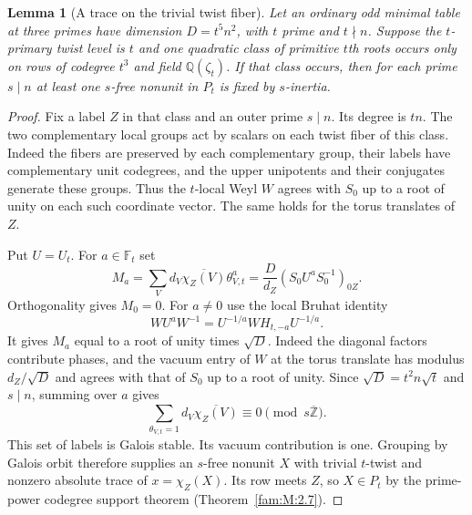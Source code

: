 \documentclass[11pt,a4paper]{article}
\numberwithin{equation}{section}
\newtheorem{lemma}[theorem]{Lemma}
\theoremstyle{remark}
\newcommand{\QQ}{\mathbb Q}
\begin{document}
\begin{lemma}[A trace on the trivial twist fiber]\label{fam:Q:5.2}\label{fam:Q:n:q13:filtered}
Let an ordinary odd minimal table at three primes have dimension
$D=t^5n^2$, with $t$ prime and $t\nmid n$. Suppose the $t$-primary twist level
is $t$ and one quadratic class of primitive $t$th roots occurs
only on rows of codegree $t^3$ and field $\QQ(\zeta_t)$.
If that class occurs, then for each prime $s\mid n$ at least one
$s$-free nonunit in $P_t$ is fixed by $s$-inertia.
\end{lemma}
\begin{proof}
Fix a label $Z$ in that class and an outer prime $s\mid n$.
Its degree is $tn$. The two complementary local groups act by
scalars on each twist fiber of this class. Indeed the fibers are
preserved by each complementary group, their labels have
complementary unit codegrees, and the upper unipotents and their
conjugates generate these groups. Thus the $t$-local Weyl $W$
agrees with $S_0$ up to a root of unity on each such coordinate vector.
The same holds for the torus translates of $Z$.

Put $U=U_t$. For $a\in\mathbb F_t$ set
\[
 M_a=\sum_V d_V\overline{\chi_Z(V)}\theta_{V,t}^{a}
     =\frac{D}{d_Z}(S_0U^a S_0^{-1})_{0Z}.
\]
Orthogonality gives $M_0=0$. For $a\ne0$ use the local Bruhat identity
\[
               WU^aW^{-1}=U^{-1/a}WH_{t,-a}U^{-1/a}.
\]
It gives $M_a$ equal to a root of unity times $\sqrt D$. Indeed
the diagonal factors contribute phases, and the vacuum entry of
$W$ at the torus translate has modulus $d_Z/\sqrt D$ and
agrees with that of $S_0$ up to a root of unity. Since
$\sqrt D=t^2 n\sqrt t$ and $s\mid n$, summing over $a$ gives
\[
           \sum_{\theta_{V,t}=1} d_V\overline{\chi_Z(V)}
                      \equiv0\pmod {s\overline{\mathbb Z}} .
\]
This set of labels is Galois stable. Its vacuum contribution is
one. Grouping by Galois orbit therefore supplies an $s$-free
nonunit $X$ with trivial $t$-twist and nonzero absolute trace of
$x=\chi_Z(X)$. Its row meets $Z$, so $X\in P_t$ by the
prime-power codegree support theorem (Theorem~\ref{fam:M:2.7}).


\end{proof}
\end{document}
